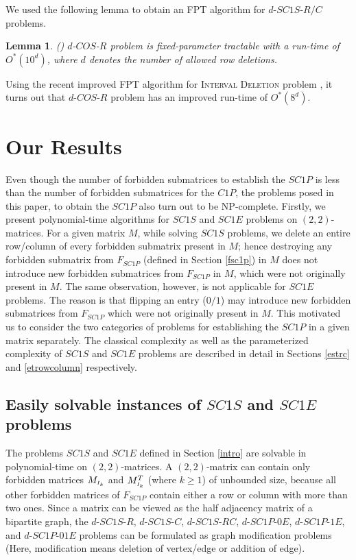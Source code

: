 \documentclass[review, 1p]{elsarticle}
\newtheorem{lemma}{Lemma}
\begin{document}
\noindent We used the following lemma to obtain an FPT algorithm for $d$-$SC1S$-$R/C$  problems.
\begin{lemma} \textup{(\cite[Theorem 7]{narayanaswamy2015obtaining})} \label{lemma11}
$d$-$COS$-$R$ problem is fixed-parameter tractable with a run-time of $O^{*}(10^{d})$, where $d$ denotes the number of allowed row deletions.
\end{lemma}
 Using the recent improved FPT algorithm for \textsc{Interval Deletion} problem \cite{cao2016linear}, it turns out that $d$-$COS$-$R$ problem has an improved run-time of $O^{*}(8^{d})$.
\section{Our Results}\label{result}
Even though the number of forbidden submatrices to establish the $SC1P$ is less than the number of forbidden submatrices for the $C1P$, the problems posed in this paper, to obtain the $SC1P$ also turn out to be NP-complete. Firstly, we  present polynomial-time algorithms for $SC1S$ and $SC1E$ problems on $(2,2)$-matrices. For a given matrix $M$, while solving $SC1S$ problems, we delete an entire row/column of every forbidden submatrix present in $M$; hence destroying any forbidden submatrix from $F_{SC1P}$ (defined in Section \ref{fsc1p}) in $M$ does not introduce new forbidden submatrices from $F_{SC1P}$ in $M$, which were not originally present in $M$. The same observation, however, is not applicable for $SC1E$ problems. The reason is that flipping an entry ($0/1$) may introduce new forbidden submatrices from $F_{SC1P}$ which were not originally  present in $M$. This motivated us to consider the two categories of problems for establishing the $SC1P$ in a given matrix separately. The classical complexity as well as the parameterized complexity of $SC1S$ and $SC1E$ problems are described in detail in Sections \ref{estrc} and \ref{etrowcolumn} respectively.
\subsection{\textup{\textbf{Easily solvable instances of $SC1S$ and $SC1E$ problems}}} \label{esly}
The problems $SC1S$ and $SC1E$ defined in Section \ref{intro} are solvable in polynomial-time on $(2,2)$-matrices. A $(2, 2)$-matrix can contain only forbidden matrices $M_{\mathsmaller I_{k}}$ and  $M^{T}_{\mathsmaller{I_{k}}}$ (where $k \geq 1$) of unbounded size, because all other forbidden matrices of $F_{SC1P}$ contain either a row or column with more than two ones. Since a matrix can be viewed as the half adjacency matrix of a bipartite graph, the $d$-$SC1S$-$R$, $d$-$SC1S$-$C$, $d$-$SC1S$-$RC$, $d$-$SC1P$-$0E$, $d$-$SC1P$-$1E$, and $d$-$SC1P$-$01E$ problems can be formulated as graph modification problems (Here, modification means deletion of vertex/edge or addition of edge).
\end{document}
